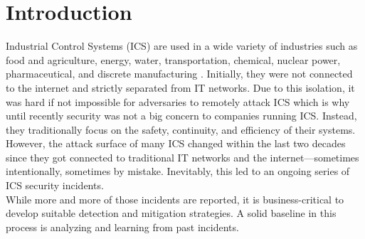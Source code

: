 \documentclass[runningheads]{llncs}
\begin{document}
\section{Introduction}
Industrial Control Systems (ICS) are used in a wide variety of industries such as food and agriculture, energy, water, transportation, chemical, nuclear power, pharmaceutical, and discrete manufacturing \cite{stouffer.2011}.
Initially, they were not connected to the internet and strictly separated from IT networks.
Due to this isolation, it was hard if not impossible for adversaries to remotely attack ICS which is why until recently security was not a big concern to companies running ICS.
Instead, they traditionally focus on the safety, continuity, and efficiency of their systems.
However, the attack surface of many ICS changed within the last two decades since they got connected to traditional IT networks and the internet---sometimes intentionally, sometimes by mistake.
Inevitably, this led to an ongoing series of ICS security incidents.\\
While more and more of those incidents are reported, it is business-critical to develop suitable detection and mitigation strategies.
A solid baseline in this process is analyzing and learning from past incidents.
\end{document}
